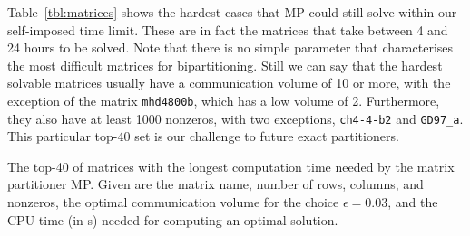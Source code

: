 Table~\ref{tbl:matrices} shows the hardest cases that MP could still
solve within our self-imposed time limit.
These are in fact the matrices that take between 4 and 24 hours to be solved.
Note that there is no simple parameter that characterises the most difficult  matrices
for bipartitioning. Still we can say 
that the hardest solvable matrices usually have a communication volume of 10 or more,
with the exception
of the matrix \texttt{mhd4800b}, which has a low volume of 2.
Furthermore, they also have at least 1000 nonzeros, with two exceptions, \texttt{ch4-4-b2}
and \texttt{GD97\_a}. This particular top-40 set is our challenge to future exact partitioners.


\begin{table}[p]
\caption{The top-40 of matrices with the longest computation time needed by
the matrix partitioner MP. Given are the matrix name, number of rows, columns, and nonzeros,
the optimal communication volume for the choice $\epsilon=0.03$,
and the CPU time (in s) needed for computing 
an optimal solution.}
\label{tbl:matrices}


\end{table}
